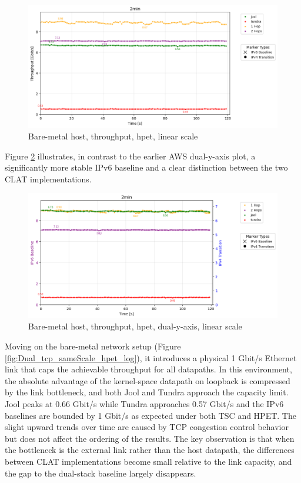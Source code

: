 \begin{figure}[H]
    \centering
    \includegraphics[width=1\textwidth]{resources/finalPlots/combinedplots/SingleLocal_tcp_sameScale_hpet_2min_linear.png}
    \caption{Bare-metal host, throughput, hpet, linear scale}
    \label{fig:Local_tcp_sameScale_hpet_linear}
\end{figure}

Figure \ref{fig:Local_tcp_dualAxis_hpet_linear} illustrates, in contrast to the earlier AWS dual-y-axis plot, a significantly more stable IPv6 baseline and a clear distinction between the two CLAT implementations.

\begin{figure}[H]
    \centering
    \includegraphics[width=1\textwidth]{resources/finalPlots/Jitterplots/LocalSingle_tcp_dualAxis_hpet_2min_linear.png}
    \caption{Bare-metal host, throughput, hpet, dual-y-axis, linear scale}
    \label{fig:Local_tcp_dualAxis_hpet_linear}
\end{figure}



Moving on the bare-metal network setup (Figure \ref{fig:Dual_tcp_sameScale_hpet_log}), it introduces a physical 1 Gbit/s Ethernet link that caps the achievable throughput for all datapaths. In this environment, the absolute advantage of the kernel-space datapath on loopback is compressed by the link bottleneck, and both Jool and Tundra approach the capacity limit. Jool peaks at 0.66 Gbit/s while Tundra approaches 0.57 Gbit/s and the IPv6 baselines are bounded by 1 Gbit/s as expected under both TSC and HPET. The slight upward trends over time are caused by TCP congestion control behavior\cite{rfc5681} but does not affect the ordering of the results. The key observation is that when the bottleneck is the external link rather than the host datapath, the differences between CLAT implementations become small relative to the link capacity, and the gap to the dual-stack baseline largely disappears.


